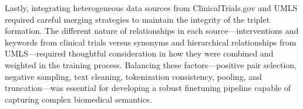 Lastly, integrating heterogeneous data sources from ClinicalTrials.gov and UMLS required careful merging strategies to maintain the integrity of the triplet formation. The different nature of relationships in each source—interventions and keywords from clinical trials versus synonyms and hierarchical relationships from UMLS—required thoughtful consideration in how they were combined and weighted in the training process. Balancing these factors—positive pair selection, negative sampling, text cleaning, tokenization consistency, pooling, and truncation—was essential for developing a robust finetuning pipeline capable of capturing complex biomedical semantics.

\newpage



